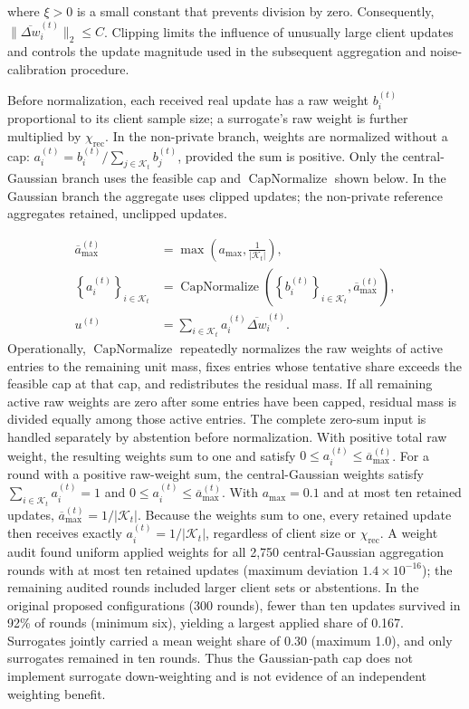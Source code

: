\documentclass[5p,times,numafflabel]{elsarticle}
\begin{document}
	where \(\xi>0\) is a small constant that prevents division by zero.
	Consequently,
	\(\|\overline{\Delta w}_{i}^{(t)}\|_{2}\leq C\).
Clipping limits the influence of unusually large client updates and
controls the update magnitude used in the subsequent aggregation and
noise-calibration procedure.
	
Before normalization, each received real update has a raw weight
\(b_i^{(t)}\) proportional to its client sample size; a surrogate's
raw weight is further multiplied by \(\chi_{\mathrm{rec}}\).
In the non-private branch, weights are normalized without a cap:
\(a_i^{(t)}=b_i^{(t)}/\sum_{j\in\mathcal K_t}b_j^{(t)}\),
provided the sum is positive. Only the central-Gaussian branch uses
the feasible cap and \(\operatorname{CapNormalize}\) shown below. In
the Gaussian branch the aggregate uses clipped updates; the
non-private reference aggregates retained, unclipped updates.


\begin{equation}
	\begin{aligned}
		\overline{a}_{\max}^{(t)}
		&=
		\max\left(
		a_{\max},
		\frac{1}{|\mathcal{K}_{t}|}
		\right),\\
		\left\{a_i^{(t)}\right\}_{i\in\mathcal{K}_{t}}
		&=
		\operatorname{CapNormalize}
		\left(
		\left\{b_i^{(t)}\right\}_{i\in\mathcal{K}_{t}},
		\overline{a}_{\max}^{(t)}
		\right),\\
		u^{(t)}
		&=
		\sum_{i\in\mathcal{K}_{t}}
		a_i^{(t)}
		\overline{\Delta w}_{i}^{(t)}.
	\end{aligned}
	\label{eq:capped-weighting}
\end{equation}
	Operationally, $\operatorname{CapNormalize}$ repeatedly normalizes
	the raw weights of active entries to the remaining unit mass,
	fixes entries whose tentative share exceeds the feasible cap at
	that cap, and redistributes the residual mass. If all remaining
	active raw weights are zero after some entries have been capped,
	residual mass is divided equally among those active entries.
	The complete zero-sum input is handled separately by abstention
	before normalization. With positive total raw weight, the
	resulting weights sum to one and satisfy
	$0\leq a_i^{(t)}\leq\overline a_{\max}^{(t)}$.
For a round with a positive raw-weight sum, the central-Gaussian
weights satisfy \(\sum_{i\in\mathcal K_t}a_i^{(t)}=1\) and
\(0\leq a_i^{(t)}\leq\overline a_{\max}^{(t)}\).
With \(a_{\max}=0.1\) and at most ten retained updates,
\(\overline a_{\max}^{(t)}=1/|\mathcal K_t|\). Because the
weights sum to one, every retained update then receives exactly
\(a_i^{(t)}=1/|\mathcal K_t|\), regardless of client size or
\(\chi_{\mathrm{rec}}\). A weight audit found uniform applied
weights for all 2,750 central-Gaussian aggregation rounds with at
most ten retained updates (maximum deviation \(1.4\times10^{-16}\));
the remaining audited rounds included larger client sets or abstentions.
In the original proposed configurations (300 rounds), fewer than
ten updates survived in 92\% of rounds (minimum six), yielding
a largest applied share of 0.167. Surrogates jointly carried a mean
weight share of 0.30 (maximum 1.0), and only surrogates remained
in ten rounds. Thus the Gaussian-path cap does not implement
surrogate down-weighting and is not evidence of an independent
weighting benefit.
\end{document}
